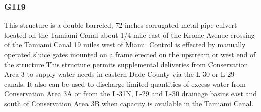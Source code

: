 %
%
%

\clearpage

\subsubsection{G119}

This structure is a double-barreled, 72 inches corrugated metal pipe culvert located on the Tamiami Canal about 1/4 mile east of the Krome Avenue crossing of the Tamiami Canal 19 miles west of Miami. Control is effected by manually operated sluice gates mounted on a frame erected on the upstream or west end of the structure.This structure permits supplemental deliveries from Conservation Area 3 to supply water needs in eastern Dade County via the L-30 or L-29 canals. It also can be used to discharge limited quantities of excess water from Conservation Area 3A or from the L-31N, L-29 and L-30 drainage basins east and south of Conservation Area 3B when capacity is available in the Tamiami Canal.

